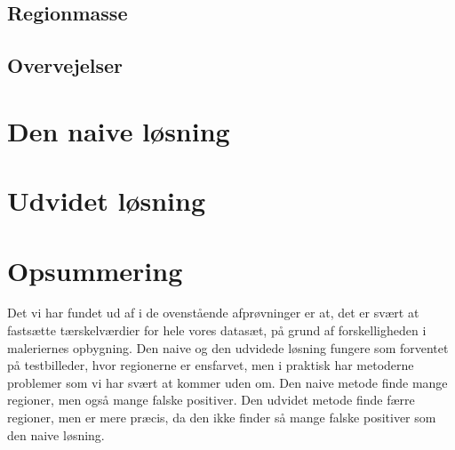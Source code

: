 {\subsection{Regionmasse}


\subsection{Overvejelser}


\section{Den naive løsning}

\clearpage

\section{Udvidet løsning}

\clearpage

\section{Opsummering}
Det vi har fundet ud af i de ovenstående afprøvninger er at, det er
svært at fastsætte tærskelværdier for hele vores datasæt, på
grund af forskelligheden i maleriernes opbygning. Den naive og den
udvidede løsning fungere som forventet på testbilleder,
hvor regionerne er ensfarvet, men i praktisk har metoderne problemer som
vi har svært at kommer uden om. Den naive metode finde mange regioner,
men også mange falske positiver. Den udvidet metode finde færre
regioner, men er mere præcis, da den ikke finder så mange falske
positiver som den naive løsning.

}

